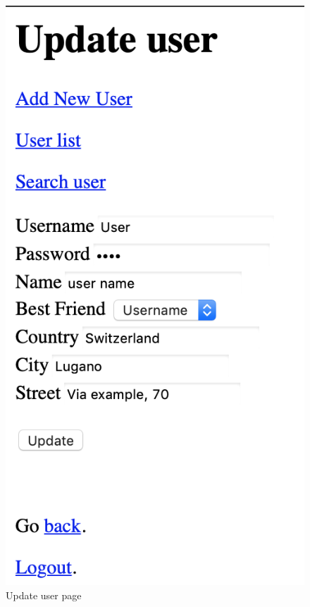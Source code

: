 \documentclass[a4paper]{report}
\begin{document}
	\begin{figure}[ht]
		\centering
		\includegraphics[scale=0.7]{images/updateuser.png}
		\caption{Update user page}
		\label{fig:update_user}
	\end{figure} 
	
\end{document}
